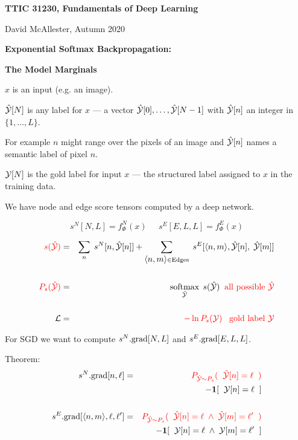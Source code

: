 




{\Huge

  \centerline{\bf TTIC 31230, Fundamentals of Deep Learning}
  \bigskip
  \centerline{David McAllester, Autumn 2020}
  \vfill
  \vfill
  \centerline{\bf Exponential Softmax Backpropagation:}
  \vfill
  \centerline{\bf The Model Marginals}
\vfill
\vfill
\vfill


$x$ is an input (e.g. an image).

\vfill
$\hat{\cal Y} [N]$ is any label for $x$ --- a vector $\hat{\cal Y}[0],\ldots,\hat{\cal Y}[N-1]$ with $\hat{\cal Y}[n]$ an integer in $\{1,\ldots,L\}$.

\vfill
For example $n$ might range over the pixels of an image and $\hat{\cal Y}[n]$ names a semantic label of pixel $n$.

\vfill
${\cal Y}[N]$ is the gold label for input $x$ --- the structured label assigned to $x$ in the training data.


We have node and edge score tensors computed by a deep network.

$$s^N[N,L] = f^N_\Phi(x) \;\;\;\;\; s^E[E,L,L]  =  f^E_\Phi(x)$$

\vfill
\begin{eqnarray*}
{\color{red} s(\hat{\cal Y})} & = & \sum_n\;s^N[n,\hat{\cal Y}[n]] + \sum_{{\mbox{$\langle n,m\rangle$}} \in \mathrm{Edges}}\;s^E[{\mbox{$\langle n,m\rangle$}},\hat{\cal Y}[n],\;\hat{\cal Y}[m]] \\
\\
{\color{red} P_s(\hat{\cal Y})} & = & \operatorname*{softmax}_{\hat{\cal Y}}\;s(\hat{\cal Y}) \;\;\mbox{\color{red} all possible $\hat{\cal Y}$} \\
\\
{\cal L} & = & {\color{red} - \ln P_s({\cal Y}) \;\;\;\mbox{gold label ${\cal Y}$}}
\end{eqnarray*}

\vfill
For SGD we want to compute {\color{red} $s^N.\mathrm{grad}[N,L]$} and {\color{red} $s^E.\mathrm{grad}[E,L,L]$}.



Theorem:
\begin{eqnarray*}
    s^N.\mathrm{grad}[n,\ell] & = &  {\color{red} P_{\hat{\cal Y} \sim P_s}(\;\;\hat{\cal Y}[n] = \ell\;\;)} \\
    & & \;\;\;\;\;- \mathbf{1}[\;\;{\cal Y}[n] = \ell\;\;] \\
    \\
    s^E.\mathrm{grad}[{\mbox{$\langle n,m\rangle$}},\ell,\ell'] & = &  {\color{red} P_{\hat{\cal Y} \sim P_s}(\;\;\hat{\cal Y}[n] = \ell \; \wedge \; \hat{\cal Y}[m] = \ell'\;\;)} \\
    & & \;\;\;\;\;- \mathbf{1}[\;\;{\cal Y}[n] = \ell\; \wedge \; {\cal Y}[m] = \ell'\;\;]
\end{eqnarray*}

}
